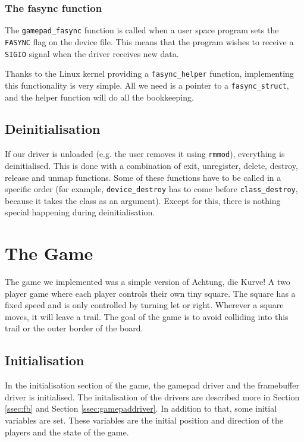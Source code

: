 \subsubsection{The fasync function}
The \texttt{gamepad\_fasync} function is called when a user space program sets the \texttt{FASYNC} flag on the device file. This means that the program wishes to receive a \texttt{SIGIO} signal when the driver receives new data.

Thanks to the Linux kernel providing a \texttt{fasync\_helper} function, implementing this functionality is very simple. All we need is a pointer to a \texttt{fasync\_struct}, and the helper function will do all the bookkeeping.

\subsection{Deinitialisation}
If our driver is unloaded (e.g. the user removes it using \texttt{rmmod}), everything is deinitialised. This is done with a combination of exit, unregister, delete, destroy, release and unmap functions. Some of these functions have to be called in a specific order (for example, \texttt{device\_destroy} has to come before \texttt{class\_destroy}, because it takes the class as an argument). Except for this, there is nothing special happening during deinitialisation.

\section{The Game} %
The game we implemented was a simple version of Achtung, die Kurve! A two player game where each player controls their own tiny square. The square has a fixed speed and is only controlled by turning let or right. Wherever a square moves, it will leave a trail. The goal of the game is to avoid colliding into this trail or the outer border of the board. 

\subsection{Initialisation}
In the initialisation section of the game, the gamepad driver and the framebuffer driver is initialised. The initalisation of the drivers are described more in Section \ref{ssec:fb} and Section \ref{ssec:gamepaddriver}. In addition to that, some initial variables are set. These variables are the initial position and direction of the players and the state of the game. 

